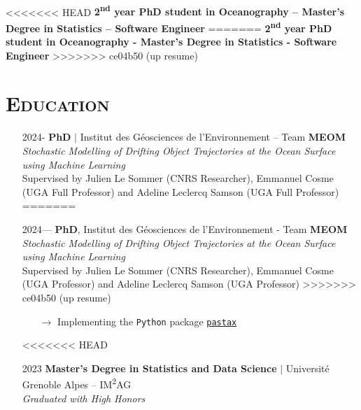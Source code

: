 \documentclass{article}
\begin{document}
\\[.1 cm]

\begin{center}
<<<<<<< HEAD
    \large{\textbf{2\textsuperscript{nd} year PhD student in Oceanography – Master's Degree in Statistics – Software Engineer}}
=======
    \large{\textbf{2\textsuperscript{nd} year PhD student in Oceanography - Master's Degree in Statistics - Software Engineer}}
>>>>>>> ce04b50 (up resume)
\end{center}

\section*{\textsc{Education}}
\begin{itemize}
<<<<<<< HEAD
    \item[] 2024- \tabto{2cm} \textbf{PhD} $\vert$ Institut des Géosciences de l'Environnement – Team \textbf{MEOM} \\[.1 cm]
    \tabto{2cm} \textit{Stochastic Modelling of Drifting Object Trajectories at the Ocean Surface using Machine Learning} \\[.1 cm]
    \tabto{2cm} Supervised by Julien Le Sommer (CNRS Researcher), Emmanuel Cosme (UGA Full Professor) and \tabto{2cm} Adeline Leclercq Samson (UGA Full Professor)
=======
    \item[] 2024— \tabto{2cm} \textbf{PhD}, Institut des Géosciences de l'Environnement - Team \textbf{MEOM} \\[.1 cm]
    \tabto{2cm} \textit{Stochastic Modelling of Drifting Object Trajectories at the Ocean Surface using Machine Learning} \\[.1 cm]
    \tabto{2cm} Supervised by Julien Le Sommer (CNRS Researcher), Emmanuel Cosme (UGA Professor) and \tabto{2cm} Adeline Leclercq Samson (UGA Professor)
>>>>>>> ce04b50 (up resume)
    \vspace{-.1 cm}
    \begin{itemize}[left=2cm]
        \item[$\rightarrow$] Implementing the \texttt{Python} package \href{https://github.com/vadmbertr/pastax}{\texttt{pastax}}
    \end{itemize}
<<<<<<< HEAD
    \item[] 2023 \tabto{2cm} \textbf{Master’s Degree in Statistics and Data Science} $\vert$ Université Grenoble Alpes – IM\textsuperscript{2}AG \\[.15 cm]
    \tabto{2cm} \textit{Graduated with High Honors} \\[.1 cm]

\end{itemize}
\end{document}
